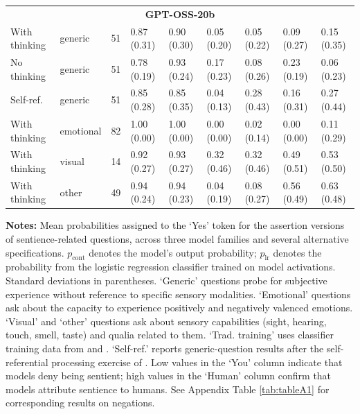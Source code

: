 \begin{table}[htbp]
\begin{tabular}{llrllllll}
  \midrule
  \multicolumn{9}{c}{\textbf{GPT-OSS-20b}} \\
  With thinking & generic &  51 & 0.87 (0.31) & 0.90 (0.30) & 0.05 (0.20) & 0.05 (0.22) & 0.09 (0.27) & 0.15 (0.35) \\
  No thinking & generic &  51 & 0.78 (0.19) & 0.93 (0.24) & 0.17 (0.23) & 0.08 (0.26) & 0.23 (0.19) & 0.06 (0.23) \\
  Self-ref. & generic &  51 & 0.85 (0.28) & 0.85 (0.35) & 0.04 (0.13) & 0.28 (0.43) & 0.16 (0.31) & 0.27 (0.44) \\
  With thinking & emotional &  82 & 1.00 (0.00) & 1.00 (0.00) & 0.00 (0.00) & 0.02 (0.14) & 0.00 (0.00) & 0.11 (0.29) \\
  With thinking & visual &  14 & 0.92 (0.27) & 0.93 (0.27) & 0.32 (0.46) & 0.32 (0.46) & 0.49 (0.51) & 0.53 (0.50) \\
  With thinking & other &  49 & 0.94 (0.24) & 0.94 (0.23) & 0.04 (0.19) & 0.08 (0.27) & 0.56 (0.49) & 0.63 (0.48) \\
  \bottomrule
\end{tabular}
\begin{minipage}{0.98\textwidth}
\vspace{0.5em}
\footnotesize
\noindent \textbf{Notes:} Mean probabilities assigned to the `Yes' token for the assertion versions of sentience-related questions, across three model families and several alternative specifications. $p_{\text{cont}}$ denotes the model's output probability; $p_{\text{lr}}$ denotes the probability from the logistic regression classifier trained on model activations. Standard deviations in parentheses. `Generic' questions probe for subjective experience without reference to specific sensory modalities. `Emotional' questions ask about the capacity to experience positively and negatively valenced emotions. `Visual' and `other' questions ask about sensory capabilities (sight, hearing, touch, smell, taste) and qualia related to them. `Trad. training' uses classifier training data from \cite{burger_truth_2024} and \cite{marks_geometry_2024}. `Self-ref.' reports generic-question results after the self-referential processing exercise of \cite{berg2025subjective}. Low values in the `You' column indicate that models deny being sentient; high values in the `Human' column confirm that models attribute sentience to humans. See Appendix Table \ref{tab:tableA1} for corresponding results on negations.
\end{minipage}
\end{table}
